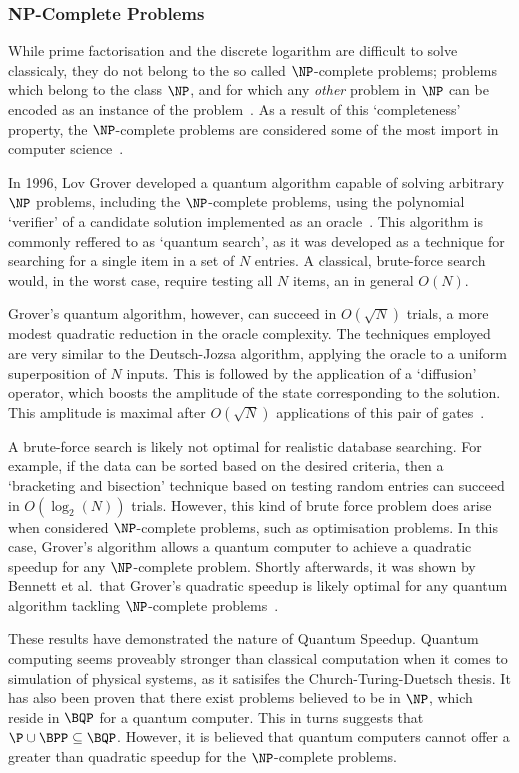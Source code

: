 \documentclass{standalone}
\begin{document}
\subsubsection*{NP-Complete Problems}\label{sec:notNP}
While prime factorisation and the discrete logarithm are difficult to solve classicaly, they do not belong to the so called $\NP$-complete problems; problems which belong to the class $\NP$, and for which any \emph{other} problem in $\NP$ can be encoded as an instance of the problem~\cite{ComplexityZoo}. As a result of this `completeness' property, the $\NP$-complete problems are considered some of the most import in computer science~\cite{Bennett1997}.
\par
In 1996, Lov Grover developed a quantum algorithm capable of solving arbitrary $\NP$ problems, including the $\NP$-complete problems, using the polynomial `verifier' of a candidate solution implemented as an oracle~\cite{Grover1996}. This algorithm is commonly reffered to as `quantum search', as it was developed as a technique for searching for a single item in a set of $N$ entries. A classical, brute-force search would, in the worst case, require testing all $N$ items, an in general $O(N)$. 
\par
Grover's quantum algorithm, however, can succeed in $O(\sqrt{N})$ trials, a more modest quadratic reduction in the oracle complexity. The techniques employed are very similar to the Deutsch-Jozsa algorithm, applying the oracle to a uniform superposition of $N$ inputs. This is followed by the application of a `diffusion' operator, which boosts the amplitude of the state corresponding to the solution. This amplitude is maximal after $O(\sqrt{N})$ applications of this pair of gates~\cite{Grover1996}.
\par
A brute-force search is likely not optimal for realistic database searching. For example, if the data can be sorted based on the desired criteria, then a `bracketing and bisection' technique based on testing random entries can succeed in $O(\log_{2}(N))$ trials. However, this kind of brute force problem does arise when considered $\NP$-complete problems, such as optimisation problems. In this case, Grover's algorithm allows a quantum computer to achieve a quadratic speedup for any $\NP$-complete problem. Shortly afterwards, it was shown by Bennett et al.\ that Grover's quadratic speedup is likely optimal for any quantum algorithm tackling $\NP$-complete problems~\cite{Bennett1997}.
\par
These results have demonstrated the nature of Quantum Speedup. Quantum computing seems proveably stronger than classical computation when it comes to simulation of physical systems, as it satisifes the Church-Turing-Duetsch thesis. It has also been proven that there exist problems believed to be in $\NP$, which reside in $\BQP$ for a quantum computer. This in turns suggests that$\P\cup\BPP\subseteq\BQP$. However, it is believed that quantum computers cannot offer a greater than quadratic speedup for the $\NP$-complete problems. 
\end{document}
